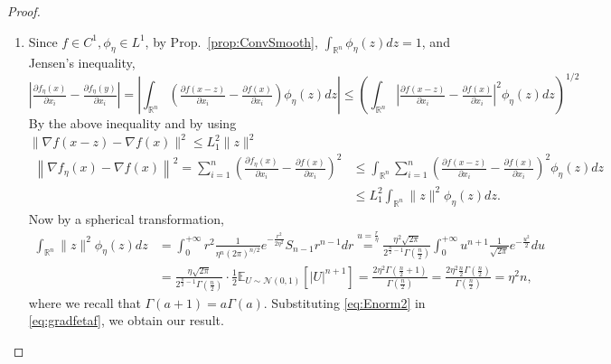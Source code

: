 \documentclass[11pt,reqno]{amsart}
\newcommand{\1}{{\bf 1}}
\newcommand{\2}{{\bf 2}}
\numberwithin{equation}{section}
\theoremstyle{remark}
\begin{document}
\begin{proof}
\begin{enumerate}[label =\alph*., wide, labelwidth=!, labelindent=0pt]
\begin{align}
			\end{align}
			From \eqref{eq:intabsphieta}, 
			\begin{equation*}
				\|\nabla f_{\eta}(x) - \nabla f_{\eta}(y)\|=\sqrt{\sum_{i=1}^n\left|\tfrac{\partial f_\eta(x)}{\partial x_i}-\tfrac{\partial f_\eta(y)}{\partial x_i}\right|^2}\leq \sqrt{\sum_{i=1}^n\left(\tfrac{2L_0}{\eta\sqrt{2\pi}}\|x-y\|\right)^2}= \tfrac{2L_0\sqrt{n}}{\eta\sqrt{2 \pi}}\|x-y\|.
			\end{equation*}
			\item Since $f \in C^1, \phi_\eta \in L^1$, by Prop.~\ref{prop:ConvSmooth}, $\int_{\mathbb{R}^n}\phi_\eta(z)dz=1$, and Jensen's inequality, 
			\begin{equation*}%
				\left|\tfrac{\partial f_\eta(x)}{\partial x_i}-\tfrac{\partial f_\eta(y)}{\partial x_i}\right|
				=\left|\int_{\mathbb{R}^n}\left(\tfrac{\partial f(x-z)}{\partial x_i}-\tfrac{\partial f(x)}{\partial x_i}\right)\phi_\eta(z)dz\right|
				\leq \left(\int_{\mathbb{R}^n}\left|\tfrac{\partial f(x-z)}{\partial x_i}-\tfrac{\partial f(x)}{\partial x_i}\right|^2\phi_\eta(z)dz\right)^{1/2}
			\end{equation*}
			By the above inequality  and by using $\|\nabla f(x-z)-\nabla f(x)\|^2 \leq L_1^2\|z\|^2$
			\begin{align}\label{eq:gradfetaf}
				\left\|\nabla f_{\eta}(x)-\nabla f(x)\right\|^2= {\sum_{i=1}^n	\left(\tfrac{\partial f_\eta(x)}{\partial x_i}-\tfrac{\partial f(x)}{\partial x_i}\right)^2}
				&\leq \int_{\mathbb{R}^n}{\sum_{i=1}^n \left(\tfrac{\partial f(x-z)}{\partial x_i}-\tfrac{\partial f(x)}{\partial x_i}\right)^2}\phi_\eta(z)dz\nonumber\\
				&\leq L_1^2\int_{\mathbb{R}^n}\|z\|^2\phi_{\eta}(z)dz.
			\end{align}
			Now by a spherical transformation,
			\begin{align}\label{eq:Enorm2}
				\int_{\mathbb{R}^n}\|z\|^2\phi_{\eta}(z)dz &=\int_0^{+\infty} r^2 \tfrac{1}{\eta^n(2\pi)^{n/2}}e^{-\tfrac{r^2}{2\eta^2}}S_{n-1}r^{n-1}dr\stackrel{u=\frac{r}{\eta}}{=} \tfrac{\eta^2 \sqrt{2 \pi}}{2^{\frac{n}{2}-1}\Gamma(\tfrac{n}{2})}\int_0^{+\infty}u^{n+1} \tfrac{1}{\sqrt{2\pi}}e^{-\frac{u^2}{2}}du\nonumber\\
				&=\tfrac{\eta \sqrt{2 \pi}}{2^{\frac{n}{2}-1}\Gamma(\tfrac{n}{2})}\cdot \frac{1}{2}\mathbb{E}_{U \sim \mathcal{N}(0,1)}[|U|^{n+1}]=\tfrac{2\eta^2\Gamma(\tfrac{n}{2}+1)}{\Gamma(\tfrac{n}{2})}=\tfrac{2\eta^2\tfrac{n}{2}\Gamma(\tfrac{n}{2})}{\Gamma(\tfrac{n}{2})}=\eta^2 n,
			\end{align}
			where we recall  that $\Gamma(a+1)=a\Gamma(a)$. Substituting \eqref{eq:Enorm2} in \eqref{eq:gradfetaf}, we obtain our result.
		\end{enumerate}
		\end{proof}
		
\end{document}
